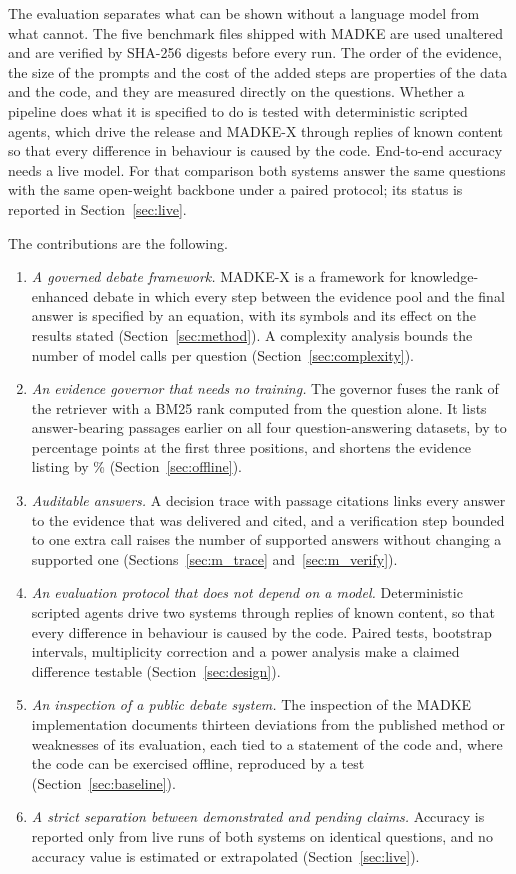 The evaluation separates what can be shown without a language model from what cannot. The five benchmark files shipped with MADKE are used unaltered and are verified by SHA-256 digests before every run. The order of the evidence, the size of the prompts and the cost of the added steps are properties of the data and the code, and they are measured directly on the \VNQuestions{} questions. Whether a pipeline does what it is specified to do is tested with deterministic scripted agents, which drive the release and MADKE-X through replies of known content so that every difference in behaviour is caused by the code. End-to-end accuracy needs a live model. For that comparison both systems answer the same questions with the same open-weight backbone under a paired protocol; its status is reported in Section~\ref{sec:live}.

The contributions are the following.
\begin{enumerate}
\item \emph{A governed debate framework.} MADKE-X is a framework for knowledge-enhanced debate in which every step between the evidence pool and the final answer is specified by an equation, with its symbols and its effect on the results stated (Section~\ref{sec:method}). A complexity analysis bounds the number of model calls per question (Section~\ref{sec:complexity}).
\item \emph{An evidence governor that needs no training.} The governor fuses the rank of the retriever with a BM25 rank computed from the question alone. It lists answer-bearing passages earlier on all four question-answering datasets, by \VGainMin{} to \VGainMax{} percentage points at the first three positions, and shortens the evidence listing by \VTokRedMean\% (Section~\ref{sec:offline}).
\item \emph{Auditable answers.} A decision trace with passage citations links every answer to the evidence that was delivered and cited, and a verification step bounded to one extra call raises the number of supported answers without changing a supported one (Sections~\ref{sec:m_trace} and~\ref{sec:m_verify}).
\item \emph{An evaluation protocol that does not depend on a model.} Deterministic scripted agents drive two systems through replies of known content, so that every difference in behaviour is caused by the code. Paired tests, bootstrap intervals, multiplicity correction and a power analysis make a claimed difference testable (Section~\ref{sec:design}).
\item \emph{An inspection of a public debate system.} The inspection of the MADKE implementation documents thirteen deviations from the published method or weaknesses of its evaluation, each tied to a statement of the code and, where the code can be exercised offline, reproduced by a test (Section~\ref{sec:baseline}).
\item \emph{A strict separation between demonstrated and pending claims.} Accuracy is reported only from live runs of both systems on identical questions, and no accuracy value is estimated or extrapolated (Section~\ref{sec:live}).
\end{enumerate}

